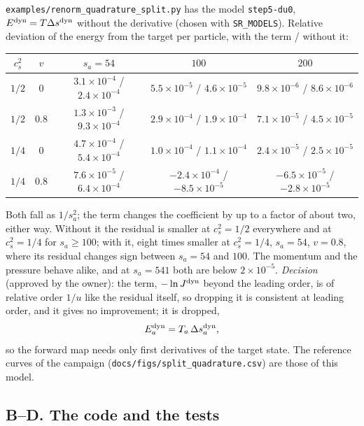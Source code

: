 \documentclass[11pt,aps,preprint,nofootinbib,superscriptaddress,tightenlines]{revtex4-2}
\def\st{\begin{equation}}
\def\stp{\end{equation}}
\begin{document}
\nolinkurl{examples/renorm_quadrature_split.py} has the model \texttt{step5-du0}, $E^{\rm dyn}=T\Delta s^{\rm dyn}$ without the derivative (chosen with
\texttt{SR\_MODELS}).  Relative deviation of the energy from the target per particle, with the term / without it:
\begin{center}
\small
\begin{tabular}{cc ccc}
\toprule
$c_s^2$ & $v$ & $s_a=54$ & $100$ & $200$ \\
\midrule
$1/2$ & $0$   & $3.1\times10^{-4}$ / $2.4\times10^{-4}$ & $5.5\times10^{-5}$ / $4.6\times10^{-5}$ & $9.8\times10^{-6}$ / $8.6\times10^{-6}$ \\
$1/2$ & $0.8$ & $1.3\times10^{-3}$ / $9.3\times10^{-4}$ & $2.9\times10^{-4}$ / $1.9\times10^{-4}$ & $7.1\times10^{-5}$ / $4.5\times10^{-5}$ \\
$1/4$ & $0$   & $4.7\times10^{-4}$ / $5.4\times10^{-4}$ & $1.0\times10^{-4}$ / $1.1\times10^{-4}$ & $2.4\times10^{-5}$ / $2.5\times10^{-5}$ \\
$1/4$ & $0.8$ & $7.6\times10^{-5}$ / $6.4\times10^{-4}$ & $-2.4\times10^{-4}$ / $-8.5\times10^{-5}$ & $-6.5\times10^{-5}$ / $-2.8\times10^{-5}$ \\
\bottomrule
\end{tabular}
\end{center}
Both fall as $1/s_a^2$; the term changes the coefficient by up to a factor of about two, either way.  Without it the residual is smaller at $c_s^2=1/2$
everywhere and at $c_s^2=1/4$ for $s_a\ge100$; with it, eight times smaller at $c_s^2=1/4$, $s_a=54$, $v=0.8$, where its residual changes sign between
$s_a=54$ and $100$.  The momentum and the pressure behave alike, and at $s_a=541$ both are below $2\times10^{-5}$.  \emph{Decision} (approved by the owner): the
term, $-\ln J^{\rm dyn}$ beyond the leading order, is of relative order $1/u$ like the residual itself, so dropping it is consistent at
leading order, and it gives no improvement; it is dropped,
\st
E^{\rm dyn}_a=T_a\,\Delta s^{\rm dyn}_a ,
\stp
so the forward map needs only first derivatives of the target state.  The reference curves of the campaign (\nolinkurl{docs/figs/split_quadrature.csv})
are those of this model.

\subsection{B--D. The code and the tests}
\end{document}
